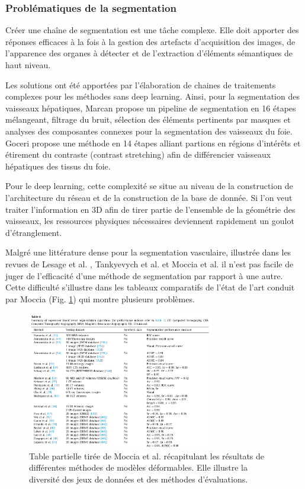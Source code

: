     \subsubsection{Problématiques de la segmentation}

    Créer une chaîne de segmentation est une tâche complexe. Elle doit apporter des réponses efficaces à la fois à la gestion des artefacts d'acquisition des images, de l'apparence des organes à détecter et de l'extraction d'éléments sémantiques de haut niveau. 

    Les solutions ont été apportées par l'élaboration de chaines de traitements complexes pour les méthodes sans deep learning. Ainsi, pour la segmentation des vaisseaux hépatiques, Marcan \cite{Marcan2014_vessel_seg} propose un pipeline de segmentation en 16 étapes mélangeant, filtrage du bruit, sélection des éléments pertinents par masques et analyses des composantes connexes pour la segmentation des vaisseaux du foie. Goceri \cite{Goceri2017_vessel} propose une méthode en 14 étapes alliant partions en régions d'intérêts et étirement du contraste (contrast stretching) afin de différencier vaisseaux hépatiques des tissus du foie.
  
    Pour le deep learning, cette complexité se situe au niveau de la construction de l'architecture du réseau et de la construction de la base de donnée. Si l'on veut traiter l'information en 3D afin de tirer partie de l'ensemble de la géométrie des vaisseaux, les ressources physiques nécessaires deviennent rapidement un goulot d'étranglement.  
    
    Malgré une littérature dense pour la segmentation vasculaire, illustrée dans les revues de Lesage et al. \cite{Lesage2009_review}, Tankyevych et al. \cite{Tankyevych2011_angiographic} et Moccia et al. \cite{Moccia2018_survey} il n'est pas facile de juger de l'efficacité d'une méthode de segmentation par rapport à une autre. Cette difficulté s'illustre dans les tableaux comparatifs de l'état de l'art conduit par  Moccia (Fig. \ref{fig:custom_fig}) qui montre plusieurs problèmes.

    \begin{figure}[h]
      \centering
      \includegraphics[height=6cm]{Images/Moccia_example.png}
      \caption{Table partielle tirée de Moccia et al. \cite{Moccia2018_survey} récapitulant les résultats de différentes méthodes de modèles déformables. Elle illustre la diversité des jeux de données et des méthodes d'évaluations.}
      \label{fig:custom_fig}
    \end{figure}

